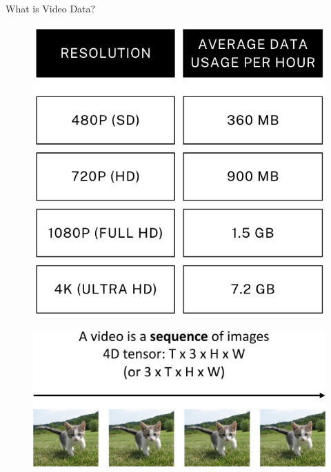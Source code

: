 \begin{frame}[allowframebreaks]{What is Video Data?}
\begin{figure}
    \end{figure}
\framebreak
    \begin{figure}
        \centering
        \includegraphics[width=1\textwidth,height=0.9\textheight,keepaspectratio]{images/video/video_properties-2.png}
    \end{figure}
\framebreak
    \begin{figure}
        \centering
        \includegraphics[width=1\textwidth,height=0.9\textheight,keepaspectratio]{images/video/slide_3_1_img.jpg}
    \end{figure}
\end{frame}


